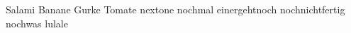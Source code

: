 \null\vfill\null
	Salami \cite{Kogel2010} Banane \cite{Espeloer1997} Gurke \cite{Higaonna1985} Tomate \cite{Nakayama2020} nextone \cite{Sebej1998} nochmal \cite{Gsodam1992} einergehtnoch \cite{Tartaglia2019} nochnichtfertig \cite{Higaonna1986,Higaonna1989,Higaonna1990} nochwas \cite{GKD2023} \cite{Noepel2007,Noepel2021} lulale \cite{Test2024}
\printbibliography
\null\vfill\null
\setlength{\tabcolsep}{6pt}